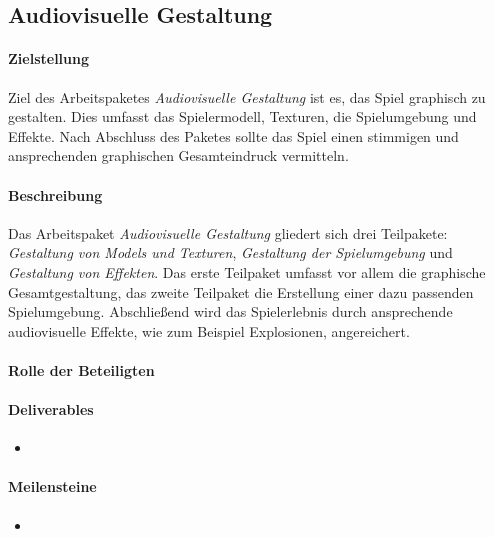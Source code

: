 \subsection{Audiovisuelle Gestaltung}

\paragraph{Zielstellung}\noindent
Ziel des Arbeitspaketes \textit{Audiovisuelle Gestaltung} ist es, das Spiel graphisch zu gestalten. Dies umfasst das Spielermodell, Texturen, die Spielumgebung und Effekte. Nach Abschluss des Paketes sollte das Spiel einen stimmigen und ansprechenden graphischen Gesamteindruck vermitteln.

\paragraph{Beschreibung}\noindent
Das Arbeitspaket \textit{Audiovisuelle Gestaltung} gliedert sich drei Teilpakete: \textit{Gestaltung von Models und Texturen}, \textit{Gestaltung der Spielumgebung} und \textit{Gestaltung von Effekten}. Das erste Teilpaket umfasst vor allem die graphische Gesamtgestaltung, das zweite Teilpaket die Erstellung einer dazu passenden Spielumgebung. Abschließend wird das Spielerlebnis durch ansprechende audiovisuelle Effekte, wie zum Beispiel Explosionen, angereichert.

\paragraph{Rolle der Beteiligten}\noindent

\paragraph{Deliverables}\noindent
\begin{itemize}
\item 
\end{itemize}

\paragraph{Meilensteine}\noindent
\begin{itemize}
\item 
\end{itemize}